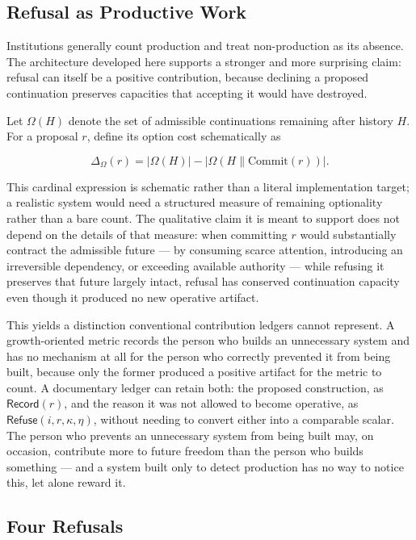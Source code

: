 \documentclass[11pt,oneside]{article}
\theoremstyle{plain}
\theoremstyle{definition}
\newcommand{\Record}{\mathsf{Record}}
\newcommand{\Refuse}{\mathsf{Refuse}}
\begin{document}
\subsection{Refusal as Productive Work}

Institutions generally count production and treat non-production as its absence. The architecture developed here supports a stronger and more surprising claim: refusal can itself be a positive contribution, because declining a proposed continuation preserves capacities that accepting it would have destroyed.

Let $\Omega(H)$ denote the set of admissible continuations remaining after history $H$. For a proposal $r$, define its option cost schematically as

\begin{equation}
\Delta_\Omega(r) = |\Omega(H)| - |\Omega(H \mathbin{\|} \mathrm{Commit}(r))|.
\end{equation}

This cardinal expression is schematic rather than a literal implementation target; a realistic system would need a structured measure of remaining optionality rather than a bare count. The qualitative claim it is meant to support does not depend on the details of that measure: when committing $r$ would substantially contract the admissible future --- by consuming scarce attention, introducing an irreversible dependency, or exceeding available authority --- while refusing it preserves that future largely intact, refusal has conserved continuation capacity even though it produced no new operative artifact.

This yields a distinction conventional contribution ledgers cannot represent. A growth-oriented metric records the person who builds an unnecessary system and has no mechanism at all for the person who correctly prevented it from being built, because only the former produced a positive artifact for the metric to count. A documentary ledger can retain both: the proposed construction, as $\Record(r)$, and the reason it was not allowed to become operative, as $\Refuse(i, r, \kappa, \eta)$, without needing to convert either into a comparable scalar. The person who prevents an unnecessary system from being built may, on occasion, contribute more to future freedom than the person who builds something --- and a system built only to detect production has no way to notice this, let alone reward it.

\subsection{Four Refusals}
\end{document}
